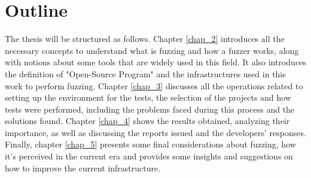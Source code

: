 \section{Outline}
The thesis will be structured as follows.
\newline
Chapter \ref{chap_2} introduces all the necessary concepts to understand what is fuzzing and how a fuzzer works, along with notions about some tools that are widely used in this field. It also introduces the definition of "Open-Source Program" and the infrastructures used in this work to perform fuzzing.
\newline
{}
Chapter \ref{chap_3} discusses all the operations related to setting up the environment for the tests, the selection of the projects and how tests were performed, including the problems faced during this process and the solutions found.
\newline
Chapter \ref{chap_4} shows the results obtained, analyzing their importance, as well as discussing the reports issued and the developers' responses.
\newline
Finally, chapter \ref{chap_5} presents some final considerations about fuzzing, how it's perceived in the current era and provides some insights and suggestions on how to improve the current infrastructure.
\newline \newline \newline
{}